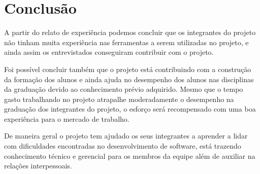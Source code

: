 \section{Conclusão}
\label{sec:conclusao}

A partir do relato de experiência podemos concluir que os integrantes do projeto não tinham muita experiência nas ferramentas a serem utilizadas no projeto, e ainda assim os entrevistados conseguiram contribuir com o projeto.

Foi possível concluir também que o projeto está contribuindo com a construção da formação dos alunos e ainda ajuda no desempenho dos alunos nas disciplinas da graduação devido ao conhecimento prévio adquirido. Mesmo que o tempo gasto trabalhando no projeto atrapalhe moderadamente o desempenho na graduação dos integrantes do projeto, o esforço será recompensado com uma boa experiência para o mercado de trabalho.

De maneira geral o projeto tem ajudado os seus integrantes a aprender a lidar com dificuldades encontradas no desenvolvimento de software, está trazendo conhecimento técnico e gerencial para os membros da equipe além de auxiliar na relações interpessoais.